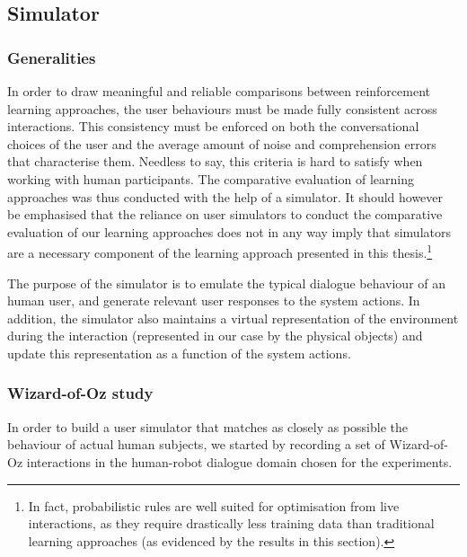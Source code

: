 \subsection{Simulator}

\subsubsection*{Generalities}

In order to draw meaningful and reliable comparisons between reinforcement learning approaches, the user behaviours must be made fully consistent across interactions.  This consistency must be enforced on both the conversational choices of the user and the average amount of noise and comprehension errors that characterise them. Needless to say, this criteria is hard to satisfy when working with human participants. The comparative evaluation of learning approaches was thus conducted with the help of a simulator. It should however be emphasised that the reliance on user simulators to conduct the comparative evaluation of our learning approaches does not in any way imply that simulators are a necessary component of the learning approach presented in this thesis.\footnote{In fact, probabilistic rules are well suited for optimisation from live interactions, as they require drastically less training data than traditional learning approaches (as evidenced by the results in this section).}

The purpose of the simulator is to emulate the typical dialogue behaviour of an human user, and generate relevant user responses to the system actions.  In addition, the simulator also maintains a virtual representation of the environment during the interaction (represented in our case by the physical objects) and update this representation as a function of the system actions.


\subsubsection*{Wizard-of-Oz study}

In order to build a user simulator that matches as closely as possible the behaviour of actual human subjects, we started by recording a set of Wizard-of-Oz interactions in the human-robot dialogue domain chosen for the experiments. 

